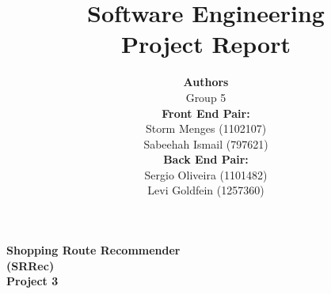 \documentclass[12pt]{article}
\begin{document}
 
\title{\textbf{Software Engineering\\Project Report}}
\author{\textbf{Authors}\\
Group 5\\
\textbf{Front End Pair:}\\
Storm Menges (1102107)\\
Sabeehah Ismail (797621)\\
\textbf{Back End Pair:}\\
Sergio Oliveira (1101482)\\
Levi Goldfein (1257360)}
\maketitle

\begin{center}
\LARGE
\textbf{Shopping Route Recommender\\(SRRec)\\Project 3}
\end{center}
\pagebreak



\tableofcontents
\pagebreak
\end{document}
